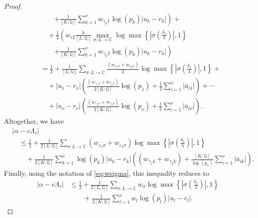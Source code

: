 \begin{proof}
\begin{align*}
	& \quad \quad \left.+ \frac{1}{[K:\mathbb{Q}]}\sum_{k = 1}^{\nu} w_{\gamma_k 1}\log(p_k)|u_k - r_k|\right) + \\
	& \quad + \frac{1}{2}\left(w_{\varepsilon 2} \frac{b}{[L:\mathbb{Q}]} \max_{\sigma :L \to \mathbb{C}} \log \max \left\{ \left|\sigma\left(\frac{\delta_2}{\lambda}\right)\right|, 1\right\}\right. \\
	& \quad \quad \left.+ \frac{1}{[K:\mathbb{Q}]}\sum_{k = 1}^{\nu} w_{\gamma_k 2}\log(p_k)|u_k - r_k|\right) \\
	& = \frac{1}{2} + \frac{1}{[L:\mathbb{Q}]}\sum_{\sigma :L \to \mathbb{C}} \frac{(w_{\varepsilon_1 \sigma} + w_{\varepsilon_2 \sigma})}{2}\log \max \left\{ \left|\sigma\left(\frac{\delta_2}{\lambda}\right)\right|, 1\right\} + \\
	& \quad + |u_1 - r_1|\left( \frac{(w_{\gamma_1 1} + w_{\gamma_2 1})}{2[K:\mathbb{Q}]}\log(p_1) + \frac{1}{2}\sum_{i=1}^{\nu}|\overline{a}_{i1}|\right) + \cdots \\
	& \quad + |u_{\nu} - r_{\nu}|\left( \frac{(w_{\gamma_1 {\nu}} + w_{\gamma_2 {\nu}})}{2[K:\mathbb{Q}]}\log(p_{\nu}) + \frac{1}{2}\sum_{i=1}^{\nu}|\overline{a}_{i{\nu}}|\right). 
\end{align*}
Altogether, we have
\begin{align*}
& |\alpha-c\Lambda_\tau| \\
	& \quad \leq \frac{1}{2} + \frac{1}{2[L:\mathbb{Q}]}\sum_{\sigma :L \to \mathbb{C}} (w_{\varepsilon_1 \sigma} + w_{\varepsilon_2 \sigma})\log \max \left\{ \left|\sigma\left(\frac{\delta_2}{\lambda}\right)\right|, 1\right\} \\
	& \quad \quad+ \frac{1}{2[K:\mathbb{Q}]}\sum_{k = 1}^{\nu} \log(p_k)|u_k - r_k|\left( (w_{\gamma_1 k} + w_{\gamma_2 k}) + \frac{[K:\mathbb{Q}]}{\log(p_k)}\sum_{i=1}^{\nu}|\overline{a}_{ik}|\right).
\end{align*}
Finally, using the notation of \eqref{eq:wsigma}, this inequality reduces to
\begin{align*}
|\alpha-c\Lambda_\tau|
	& \leq \frac{1}{2} + \frac{1}{2[L:\mathbb{Q}]}\sum_{\sigma :L \to \mathbb{C}} w_{\sigma}\log \max \left\{ \left|\sigma\left(\frac{\delta_2}{\lambda}\right)\right|, 1\right\} \\
	&\quad\quad + \frac{1}{2[K:\mathbb{Q}]}\sum_{l = 1}^{\nu}w_l \log(p_l)|u_l - r_l|.
\end{align*}


\end{proof}
